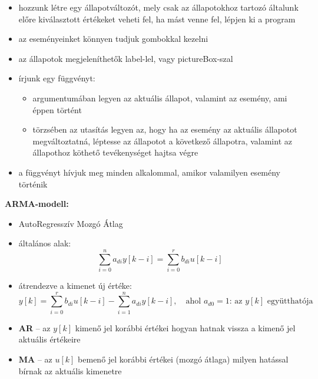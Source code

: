 \begin{itemize}
\begin{enumerate}
        \item várakozik (2. lépés) vagy amíg a ,,lépj ki'' esemény meg nem érkezik
        \item kilép
    \end{enumerate}
    \item hozzunk létre egy állapotváltozót, mely csak az állapotokhoz tartozó általunk előre kiválasztott értékeket veheti fel, ha mást venne fel, lépjen ki a program
    \item az eseményeinket könnyen tudjuk gombokkal kezelni
    \item az állapotok megjeleníthetők label-lel, vagy pictureBox-szal
    \item írjunk egy függvényt:
    \begin{itemize}
        \item argumentumában legyen az aktuális állapot, valamint az esemény, ami éppen történt
        \item törzsében az utasítás legyen az, hogy ha az esemény az aktuális állapotot megváltoztatná, léptesse az állapotot a következő állapotra, valamint az állapothoz köthető tevékenységet hajtsa végre
    \end{itemize}
    \item a függvényt hívjuk meg minden alkalommal, amikor valamilyen esemény történik
\end{itemize}

\textbf{ARMA-modell:}
\begin{itemize}
    \item AutoRegresszív Mozgó Átlag
    \item általános alak:
    \begin{equation*}
        \sum_{i=0}^n a_{di} y[k-i] = \sum_{i=0}^r b_{di} u[k-i]
    \end{equation*}
    \item átrendezve a kimenet új értéke:
    \begin{equation*}
        y[k] = \sum_{i=0}^r b_{di} u[k-i] - \sum_{i=1}^n a_{di} y[k-i], \quad \text{ahol } a_{d0} = 1 \text{: az } y[k] \text{ együtthatója}
    \end{equation*}
    \item \textbf{AR} -- az $y[k]$ kimenő jel korábbi értékei hogyan hatnak vissza a kimenő jel aktuális értékeire
    \item \textbf{MA} -- az $u[k]$ bemenő jel korábbi értékei (mozgó átlaga) milyen hatással bírnak az aktuális kimenetre
\end{itemize}

